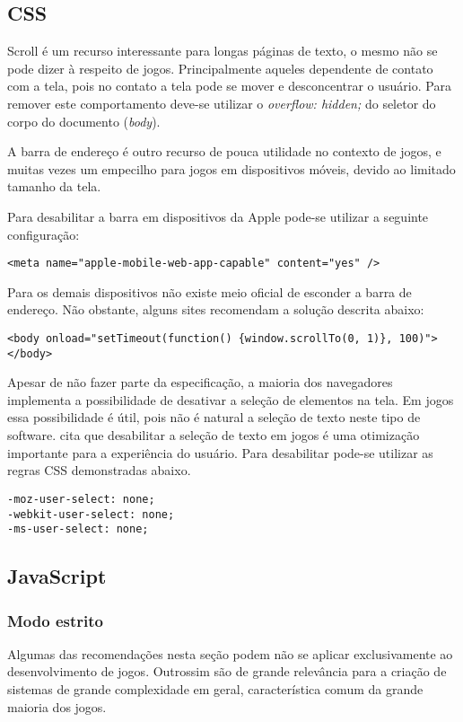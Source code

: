 \subsection{CSS}

Scroll é um recurso interessante para longas páginas de texto,
o mesmo não se pode dizer à respeito de jogos.
Principalmente aqueles dependente de contato com a tela, pois
no contato a tela pode se mover e desconcentrar o usuário. Para
remover este comportamento deve-se utilizar o \textit{overflow:
hidden;} do seletor do corpo do documento (\textit{body}).

A barra de endereço é outro recurso de pouca utilidade no contexto de
jogos, e muitas vezes um empecilho para jogos em dispositivos móveis,
devido ao limitado tamanho da tela.

Para desabilitar a barra em dispositivos da Apple pode-se utilizar a
seguinte configuração:

\begin{verbatim}
<meta name="apple-mobile-web-app-capable" content="yes" />
\end{verbatim}

Para os demais dispositivos não existe meio oficial de esconder a barra
de endereço. Não obstante, alguns sites recomendam a solução descrita abaixo:

\begin{verbatim}
<body onload="setTimeout(function() {window.scrollTo(0, 1)}, 100)">
</body>
\end{verbatim}

Apesar de não fazer parte da especificação, a maioria dos navegadores
implementa a possibilidade de desativar a seleção de elementos na tela.
Em jogos essa possibilidade é útil, pois não é natural a seleção de texto
neste tipo de software. \cite{html5mostwanted} cita que desabilitar
a seleção de texto em jogos é uma otimização importante para a
experiência do usuário. Para desabilitar pode-se utilizar as regras
CSS demonstradas abaixo.

\begin{verbatim}
-moz-user-select: none;
-webkit-user-select: none;
-ms-user-select: none;
\end{verbatim}

\subsection{JavaScript}

\subsubsection{Modo estrito}
Algumas das recomendações nesta seção podem não se aplicar
exclusivamente ao desenvolvimento de jogos. Outrossim são de grande
relevância para a criação de sistemas de grande complexidade em geral,
característica comum da grande maioria dos jogos.

